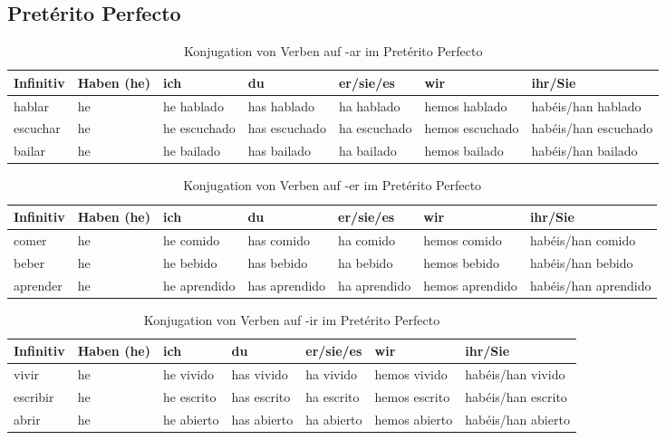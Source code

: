 \documentclass{article}
\begin{document}
\subsection{Pretérito Perfecto}



\begin{table}[htb]
\centering
\caption{Konjugation von Verben auf -ar im Pretérito Perfecto}
\begin{tabular}{@{}lllllll@{}}
\toprule
\textbf{Infinitiv} & \textbf{Haben (he)} & \textbf{ich} & \textbf{du} & \textbf{er/sie/es} & \textbf{wir} & \textbf{ihr/Sie} \\
\midrule
hablar & he & he hablado & has hablado & ha hablado & hemos hablado & habéis/han hablado \\
escuchar & he & he escuchado & has escuchado & ha escuchado & hemos escuchado & habéis/han escuchado \\
bailar & he & he bailado & has bailado & ha bailado & hemos bailado & habéis/han bailado \\
\bottomrule
\end{tabular}
\end{table}

\begin{table}[h!]
\centering
\caption{Konjugation von Verben auf -er im Pretérito Perfecto}
\begin{tabular}{@{}lllllll@{}}
\toprule
\textbf{Infinitiv} & \textbf{Haben (he)} & \textbf{ich} & \textbf{du} & \textbf{er/sie/es} & \textbf{wir} & \textbf{ihr/Sie} \\
\midrule
comer & he & he comido & has comido & ha comido & hemos comido & habéis/han comido \\
beber & he & he bebido & has bebido & ha bebido & hemos bebido & habéis/han bebido \\
aprender & he & he aprendido & has aprendido & ha aprendido & hemos aprendido & habéis/han aprendido \\
\bottomrule
\end{tabular}
\end{table}

\begin{table}[h!]
\centering
\caption{Konjugation von Verben auf -ir im Pretérito Perfecto}
\begin{tabular}{@{}lllllll@{}}
\toprule
\textbf{Infinitiv} & \textbf{Haben (he)} & \textbf{ich} & \textbf{du} & \textbf{er/sie/es} & \textbf{wir} & \textbf{ihr/Sie} \\
\midrule
vivir & he & he vivido & has vivido & ha vivido & hemos vivido & habéis/han vivido \\
escribir & he & he escrito & has escrito & ha escrito & hemos escrito & habéis/han escrito \\
abrir & he & he abierto & has abierto & ha abierto & hemos abierto & habéis/han abierto \\
\bottomrule
\end{tabular}
\end{table}
\end{document}

